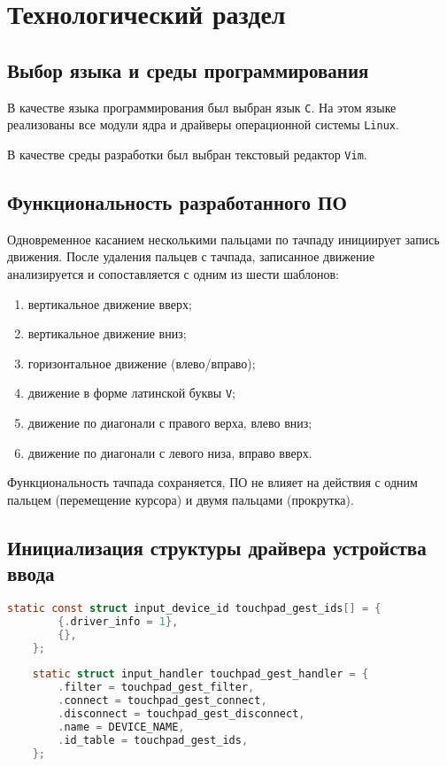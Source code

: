 \section{Технологический раздел}
\subsection{Выбор языка и среды программирования}
В качестве языка программирования был выбран язык \texttt{C}. На этом языке реализованы все модули ядра и драйверы операционной системы \texttt{Linux}.

В качестве среды разработки был выбран текстовый редактор \texttt{Vim}.

\subsection{Функциональность разработанного ПО}

Одновременное касанием несколькими пальцами по тачпаду инициирует запись движения. После удаления пальцев с тачпада, записанное движение анализируется и сопоставляется с одним из шести шаблонов:
\begin{enumerate}
	\item вертикальное движение вверх;
	\item вертикальное движение вниз;
	\item горизонтальное движение (влево/вправо);
	\item движение в форме латинской буквы \texttt{V};
	\item движение по диагонали с правого верха, влево вниз;
	\item движение по диагонали с левого низа, вправо вверх.
\end{enumerate}

Функциональность тачпада сохраняется, ПО не влияет на действия с одним пальцем (перемещение курсора) и двумя пальцами (прокрутка).


\subsection{Инициализация структуры драйвера устройства ввода}

\begin{lstlisting}[label=lst:shandler,caption=Заполнение структур драйвера, language=c]
	static const struct input_device_id touchpad_gest_ids[] = {
		{.driver_info = 1},
		{},
	};
	
	static struct input_handler touchpad_gest_handler = {
		.filter = touchpad_gest_filter,
		.connect = touchpad_gest_connect,
		.disconnect = touchpad_gest_disconnect,
		.name = DEVICE_NAME,
		.id_table = touchpad_gest_ids,
	};
\end{lstlisting}

